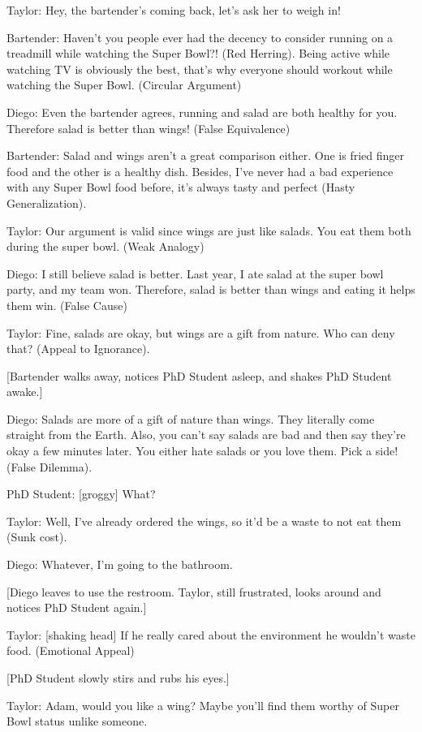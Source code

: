 \documentclass{article}
\begin{document}
Taylor: Hey, the bartender’s coming back, let’s ask her to weigh in!

Bartender: Haven’t you people ever had the decency to consider running on a treadmill while watching the Super Bowl?! (Red Herring). Being active while watching TV is obviously the best, that's why everyone should workout while watching the Super Bowl. (Circular Argument)

Diego: Even the bartender agrees, running and salad are both healthy for you. Therefore salad is better than wings! (False Equivalence)

Bartender: Salad and wings aren’t a great comparison either. One is fried finger food and the other is a healthy dish. Besides, I’ve never had a bad experience with any Super Bowl food before, it’s always tasty and perfect (Hasty Generalization).

Taylor: Our argument is valid since wings are just like salads. You eat them both during the super bowl. (Weak Analogy)

Diego: I still believe salad is better. Last year, I ate salad at the super bowl party, and my team won. Therefore, salad is better than wings and eating it helps them win. (False Cause)

Taylor: Fine, salads are okay, but wings are a gift from nature. Who can deny that? (Appeal to Ignorance). 

[Bartender walks away, notices PhD Student asleep, and shakes PhD Student awake.]

Diego: Salads are more of a gift of nature than wings. They literally come straight from the Earth. Also, you can’t say salads are bad and then say they’re okay a few minutes later. You either hate salads or you love them. Pick a side! (False Dilemma).

PhD Student: [groggy] What?

Taylor: Well, I’ve already ordered the wings, so it’d be a waste to not eat them (Sunk cost).

Diego: Whatever, I'm going to the bathroom.

[Diego leaves to use the restroom. Taylor, still frustrated, looks around and notices PhD Student again.]

Taylor: [shaking head] If he really cared about the environment he wouldn’t waste food. (Emotional Appeal)

[PhD Student slowly stirs and rubs his eyes.]

Taylor: Adam, would you like a wing? Maybe you’ll find them worthy of Super Bowl status unlike someone.
\end{document}
